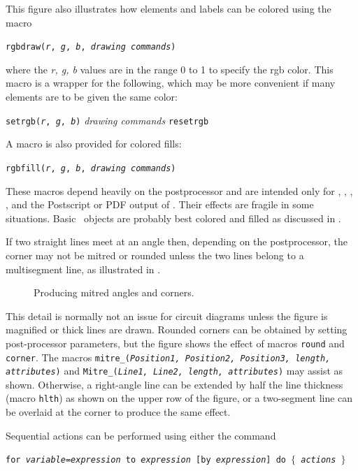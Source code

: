 This figure also illustrates how elements and labels can be colored
using the macro
\par
{\tt rgbdraw({\sl r}, {\sl g}, {\sl b}, {\sl drawing commands})}
\par
\noindent
where the {\sl r, g, b} values are in the range 0 to 1
to specify the rgb color.
This macro is a wrapper for the following, which may be more convenient
if many elements are to be given the same color:

   {\tt setrgb({\sl r}, {\sl g}, {\sl b})}
      \hfill\break\hspace*{\parindent}%
   {\sl drawing commands}
      \hfill\break\hspace*{\parindent}%
   {\tt resetrgb}

A macro is also provided for colored fills:

{\tt rgbfill({\sl r}, {\sl g}, {\sl b}, {\sl drawing commands})}

\noindent%
These macros depend heavily on the postprocessor and are intended only for 
\PSTricks, \TPGF, \MetaPost, \SVG, and the Postscript or PDF output of \dpic.
Their effects are fragile in some situations.
Basic \Pic\ objects are probably best colored and filled as discussed
in .

\pagebreak
{}%
If two straight lines meet at an angle then, depending on the postprocessor,
the corner may not be mitred or rounded unless the two lines belong to
a multisegment line, as illustrated in .
\begin{figure}[H]
   
   \caption{Producing mitred angles and corners.}
   \label{Corners}
   \end{figure}
This detail is normally
not an issue for circuit diagrams unless the figure is magnified or thick
lines are drawn.  Rounded corners can be obtained by setting post-processor
parameters, but the figure shows the effect of
macros {\tt round} and {\tt corner}.
The macros
{\tt mitre\_({\sl Position1, Position2, Position3, length, attributes})}
and
{\tt Mitre\_({\sl Line1, Line2, length, attributes})}
may assist as shown.
Otherwise, a right-angle line can be extended
by half the line thickness (macro {\tt hlth}) as shown on the upper row
of the figure,
or a two-segment line can be overlaid at the corner to produce the same effect.

Sequential actions can be performed using either the
 \dpic command

{\tt for {\sl variable}={\sl expression} to {\sl expression}
 [by {\sl expression}] do $\lbrace$ {\sl actions} $\rbrace$}

